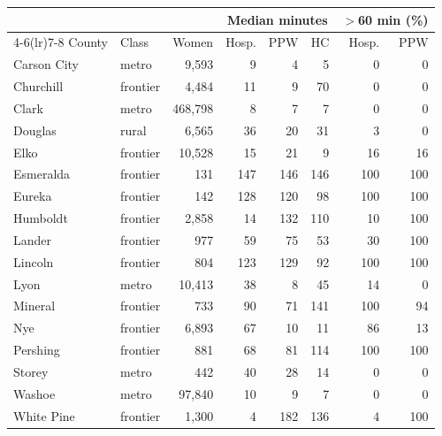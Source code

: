 \begin{tabular}{@{}llrrrrrr@{}}
\toprule
 & & & \multicolumn{3}{c}{Median minutes} & \multicolumn{2}{c}{$>$60 min (\%)} \\
\cmidrule(lr){4-6}\cmidrule(lr){7-8}
County & Class & Women & Hosp. & PPW & HC & Hosp. & PPW \\
\midrule
Carson City & metro & 9{,}593 & 9 & 4 & 5 & 0 & 0 \\
Churchill & frontier & 4{,}484 & 11 & 9 & 70 & 0 & 0 \\
Clark & metro & 468{,}798 & 8 & 7 & 7 & 0 & 0 \\
Douglas & rural & 6{,}565 & 36 & 20 & 31 & 3 & 0 \\
Elko & frontier & 10{,}528 & 15 & 21 & 9 & 16 & 16 \\
Esmeralda & frontier & 131 & 147 & 146 & 146 & 100 & 100 \\
Eureka & frontier & 142 & 128 & 120 & 98 & 100 & 100 \\
Humboldt & frontier & 2{,}858 & 14 & 132 & 110 & 10 & 100 \\
Lander & frontier & 977 & 59 & 75 & 53 & 30 & 100 \\
Lincoln & frontier & 804 & 123 & 129 & 92 & 100 & 100 \\
Lyon & metro & 10{,}413 & 38 & 8 & 45 & 14 & 0 \\
Mineral & frontier & 733 & 90 & 71 & 141 & 100 & 94 \\
Nye & frontier & 6{,}893 & 67 & 10 & 11 & 86 & 13 \\
Pershing & frontier & 881 & 68 & 81 & 114 & 100 & 100 \\
Storey & metro & 442 & 40 & 28 & 14 & 0 & 0 \\
Washoe & metro & 97{,}840 & 10 & 9 & 7 & 0 & 0 \\
White Pine & frontier & 1{,}300 & 4 & 182 & 136 & 4 & 100 \\
\bottomrule
\end{tabular}
